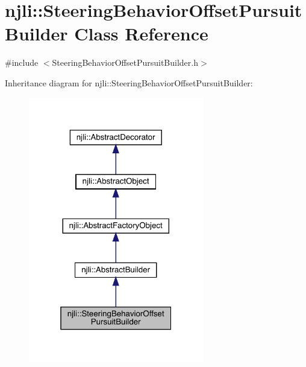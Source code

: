 \hypertarget{classnjli_1_1_steering_behavior_offset_pursuit_builder}{}\section{njli\+:\+:Steering\+Behavior\+Offset\+Pursuit\+Builder Class Reference}
\label{classnjli_1_1_steering_behavior_offset_pursuit_builder}


{\ttfamily \#include $<$Steering\+Behavior\+Offset\+Pursuit\+Builder.\+h$>$}



Inheritance diagram for njli\+:\+:Steering\+Behavior\+Offset\+Pursuit\+Builder\+:\nopagebreak
\begin{figure}[H]
\begin{center}
\leavevmode
\includegraphics[width=217pt]{classnjli_1_1_steering_behavior_offset_pursuit_builder__inherit__graph}
\end{center}
\end{figure}


